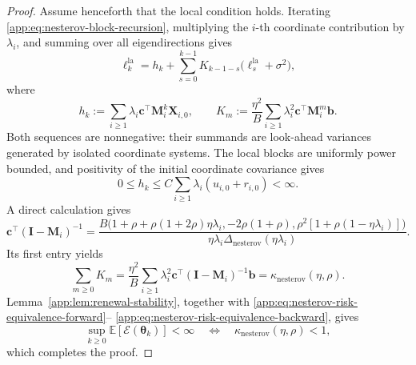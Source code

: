 \documentclass[10pt,a4paper]{amsart}
\newcommand{\EE}{\mathbb{E}}
\newcommand{\bI}{\fbf{I}}
\newcommand{\bM}{\fbf{M}}
\newcommand{\bX}{\fbf{X}}
\newcommand{\bb}{\fbf{b}}
\newcommand{\bc}{\fbf{c}}
\newcommand{\btheta}{\bm{\theta}}
\newcommand{\cE}{\mathcal{E}}
\newcommand{\fbf}[1]{\mathbf{#1}}
\renewcommand{\geq}{\geqslant}
\newcommand{\la}{\mathrm{la}}
\renewcommand{\leq}{\leqslant}
\newcommand{\nesterov}{\mathrm{nesterov}}
\begin{document}
\begin{proof}
Assume henceforth that the local condition holds. Iterating
\eqref{app:eq:nesterov-block-recursion}, multiplying the \(i\)-th coordinate contribution by \(\lambda_i\), and summing over all
eigendirections gives
\begin{equation}
\label{app:eq:nesterov-renewal}
\ell_k^{\la}
=
h_k
+
\sum_{s=0}^{k-1}
K_{k-1-s}\bigl(\ell_s^{\la}+\sigma^2\bigr),
\end{equation}
where
\[
h_k
:=
\sum_{i\geq1}
\lambda_i\bc^\top\bM_i^k\bX_{i,0},
\qquad
K_m
:=
\frac{\eta^2}{B}
\sum_{i\geq1}
\lambda_i^2\bc^\top\bM_i^m\bb.
\]
Both sequences are nonnegative: their summands are look-ahead variances generated by isolated
coordinate systems. The local blocks are uniformly power bounded, and positivity of the initial
coordinate covariance gives
\[
0\leq h_k
\leq
C\sum_{i\geq1}\lambda_i(u_{i,0}+r_{i,0})
<\infty.
\]
A direct calculation gives
\begin{equation}
\label{app:eq:nesterov-resolvent}
\bc^\top(\bI-\bM_i)^{-1}
=
\frac{
B\bigl(
1+\rho+\rho(1+2\rho)\eta\lambda_i,
-2\rho(1+\rho),
\rho^2[1+\rho(1-\eta\lambda_i)]
\bigr)
}{
\eta\lambda_i\Delta_{\nesterov}(\eta\lambda_i)
}.
\end{equation}
Its first entry yields
\[
\sum_{m\geq0}K_m
=
\frac{\eta^2}{B}
\sum_{i\geq1}
\lambda_i^2\bc^\top(\bI-\bM_i)^{-1}\bb
=
\kappa_{\nesterov}(\eta,\rho).
\]
Lemma~\ref{app:lem:renewal-stability}, together with
\eqref{app:eq:nesterov-risk-equivalence-forward}--
\eqref{app:eq:nesterov-risk-equivalence-backward}, gives
\[
\sup_{k\geq0}\EE[\cE(\btheta_k)]<\infty
\quad\Longleftrightarrow\quad
\kappa_{\nesterov}(\eta,\rho)<1,
\]
which completes the proof.

\end{proof}
\end{document}
